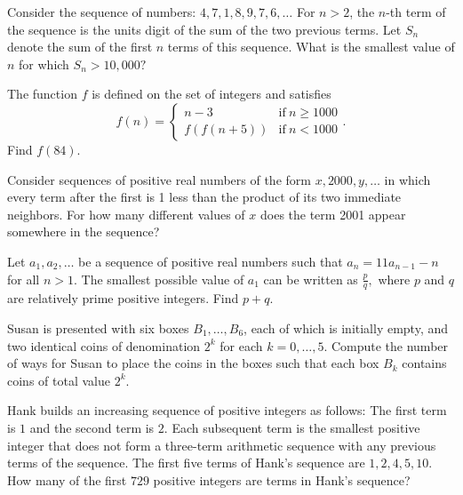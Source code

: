\documentclass[mast]{lucky}
\begin{document}
\begin{prob}[AMC 12A 2002/21]{4}
Consider the sequence of numbers: $4,7,1,8,9,7,6,\dots$ For $n>2$, the $n$-th term of the sequence is the units digit of the sum of the two previous terms. Let $S_n$ denote the sum of the first $n$ terms of this sequence. What is the smallest value of $n$ for which $S_n>10,000?$
\end{prob}

\begin{prob}[AIME 1984/7]{4}
The function $f$ is defined on the set of integers and satisfies
\[f(n)=\begin{cases} n-3&\mbox{if}\ n\ge 1000\\ f(f(n+5))&\mbox{if}\ n<1000\end{cases}.\]
Find $f(84).$
\end{prob}
    
\begin{prob}[AMC 12A 2001/25]{4}
Consider sequences of positive real numbers of the form $x, 2000, y, \dots$ in which every term after the first is 1 less than the product of its two immediate neighbors. For how many different values of $x$ does the term 2001 appear somewhere in the sequence?
\end{prob}

\begin{req}[PUMaC 2017]{4}
Let $a_1,a_2,\dots$ be a sequence of positive real numbers such that $a_n=11a_{n-1}-n$ for all $n>1.$ The smallest possible value of $a_1$ can be written as $\frac{p}{q},$ where $p$ and $q$ are relatively prime positive integers. Find $p+q.$
\end{req}
    
\begin{req}[OMO 2019]{6}
Susan is presented with six boxes $B_1, \dots, B_6$, each of which is initially empty, and two identical coins of denomination $2^k$ for each $k = 0, \dots, 5$. Compute the number of ways for Susan to place the coins in the boxes such that each box $B_k$ contains coins of total value $2^k.$
\end{req}

\begin{prob}{6}
Hank builds an increasing sequence of positive integers as follows: The first term is $1$ and the second term is $2.$ Each subsequent term is the smallest positive integer that does not form a three-term arithmetic sequence with any previous terms of the sequence. The first five terms of Hank's sequence are $1,2,4,5,10.$ How many of the first $729$ positive integers are terms in Hank's sequence?
\end{prob}
\end{document}
